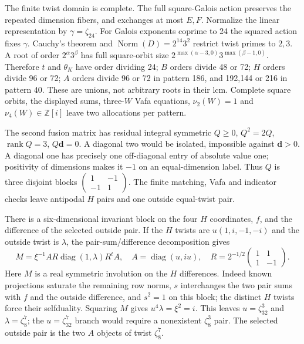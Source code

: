 The finite twist domain is complete. The full square-Galois action
preserves the repeated dimension fibers, and exchanges at most $E,F$.
Normalize the linear representation by $\gamma=\zeta_{24}$.
For Galois exponents coprime to 24 the squared action fixes $\gamma$.
Cauchy's theorem \cite{BNRWCauchy} and
$\operatorname{Norm}(D)=2^{14}3^2$ restrict twist primes to $2,3$.
A root of order $2^\alpha3^\beta$ has full square-orbit size
$2^{\max(\alpha-3,0)}3^{\max(\beta-1,0)}$. Therefore $t$ and $\theta_K$
have order dividing 24; $B$ orders divide 48 or 72; $H$ orders divide
96 or 72; $A$ orders divide 96 or 72 in pattern 186, and 192,144 or
216 in pattern 40. These are unions, not arbitrary roots in their lcm.
Complete square orbits, the displayed sums, three-$W$ Vafa equations,
$\nu_2(W)=1$ and $\nu_4(W)\in\mathbb Z[i]$ leave two allocations per
pattern.

The second fusion matrix has residual integral symmetric
$Q\ge0$, $Q^2=2Q$, $\operatorname{rank}Q=3$, $Q\mathbf d=0$.
A diagonal two would be isolated, impossible against $\mathbf d>0$.
A diagonal one has precisely one off-diagonal entry of absolute value
one; positivity of dimensions makes it $-1$ on an equal-dimension
label. Thus $Q$ is three disjoint blocks
$\left(\begin{smallmatrix}1&-1\\-1&1\end{smallmatrix}\right)$.
The finite matching, Vafa and indicator checks leave antipodal $H$
pairs and one outside equal-twist pair.

There is a six-dimensional invariant block on the four $H$ coordinates,
$f$, and the difference of the selected outside pair. If the $H$
twists are $u(1,i,-1,-i)$ and the outside twist is $\lambda$, the
pair-sum/difference decomposition gives
\[
M=\xi^{-1}A R\operatorname{diag}(1,\lambda)R^tA,\quad
A=\operatorname{diag}(u,iu),\quad
R=2^{-1/2}\begin{pmatrix}1&1\\1&-1\end{pmatrix}.
\]
Here $M$ is a real symmetric involution on the $H$ differences.
Indeed known projections saturate the remaining row norms, $s$
interchanges the two pair sums with $f$ and the outside difference,
and $s^2=1$ on this block; the distinct $H$ twists force their
selfduality. Squaring $M$ gives $u^4\lambda=\xi^2=i$.
This leaves $u=\zeta_{32}^3$ and $\lambda=\zeta_8^7$; the
$u=\zeta_{32}^7$ branch would require a nonexistent $\zeta_8^3$ pair.
The selected outside pair is the two $A$ objects of twist $\zeta_8^7$.

